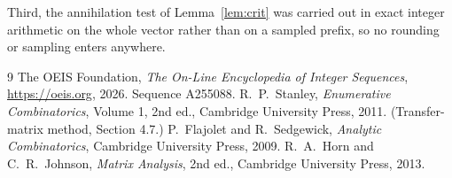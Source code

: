 \documentclass[11pt,a4paper]{article}
\theoremstyle{plain}
\theoremstyle{definition}
\begin{document}
Third, the annihilation test of Lemma~\ref{lem:crit} was carried out in exact integer
arithmetic on the whole vector rather than on a sampled prefix, so no rounding or sampling
enters anywhere.

\begin{thebibliography}{9}
 The OEIS Foundation, \emph{The On-Line Encyclopedia of Integer
Sequences}, \url{https://oeis.org}, 2026. Sequence A255088.
 R.~P.~Stanley, \emph{Enumerative Combinatorics}, Volume 1, 2nd ed.,
Cambridge University Press, 2011. (Transfer-matrix method, Section 4.7.)
 P.~Flajolet and R.~Sedgewick, \emph{Analytic Combinatorics}, Cambridge
University Press, 2009.
 R.~A.~Horn and C.~R.~Johnson, \emph{Matrix Analysis}, 2nd ed., Cambridge
University Press, 2013.
\end{thebibliography}
\end{document}
